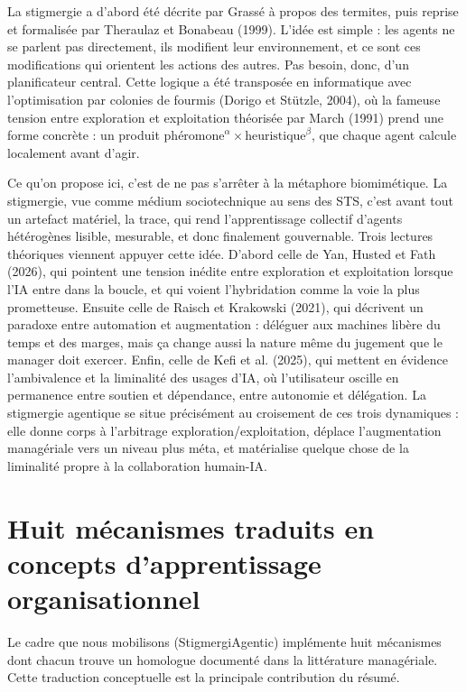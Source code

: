 \documentclass[12pt,a4paper]{article}
\begin{document}
La stigmergie a d'abord été décrite par Grassé à propos des termites, puis reprise et formalisée par Theraulaz et Bonabeau (1999). L'idée est simple : les agents ne se parlent pas directement, ils modifient leur environnement, et ce sont ces modifications qui orientent les actions des autres. Pas besoin, donc, d'un planificateur central. Cette logique a été transposée en informatique avec l'optimisation par colonies de fourmis (Dorigo et Stützle, 2004), où la fameuse tension entre exploration et exploitation théorisée par March (1991) prend une forme concrète : un produit $\text{phéromone}^{\alpha} \times \text{heuristique}^{\beta}$, que chaque agent calcule localement avant d'agir.

Ce qu'on propose ici, c'est de ne pas s'arrêter à la métaphore biomimétique. La stigmergie, vue comme médium sociotechnique au sens des STS, c'est avant tout un artefact matériel, la trace, qui rend l'apprentissage collectif d'agents hétérogènes lisible, mesurable, et donc finalement gouvernable. Trois lectures théoriques viennent appuyer cette idée. D'abord celle de Yan, Husted et Fath (2026), qui pointent une tension inédite entre exploration et exploitation lorsque l'IA entre dans la boucle, et qui voient l'hybridation comme la voie la plus prometteuse. Ensuite celle de Raisch et Krakowski (2021), qui décrivent un paradoxe entre automation et augmentation : déléguer aux machines libère du temps et des marges, mais ça change aussi la nature même du jugement que le manager doit exercer. Enfin, celle de Kefi et al. (2025), qui mettent en évidence l'ambivalence et la liminalité des usages d'IA, où l'utilisateur oscille en permanence entre soutien et dépendance, entre autonomie et délégation. La stigmergie agentique se situe précisément au croisement de ces trois dynamiques : elle donne corps à l'arbitrage exploration/exploitation, déplace l'augmentation managériale vers un niveau plus méta, et matérialise quelque chose de la liminalité propre à la collaboration humain-IA.

\section{Huit mécanismes traduits en concepts d'apprentissage organisationnel}

Le cadre que nous mobilisons (StigmergiAgentic) implémente huit mécanismes dont chacun trouve un homologue documenté dans la littérature managériale. Cette traduction conceptuelle est la principale contribution du résumé.
\end{document}
